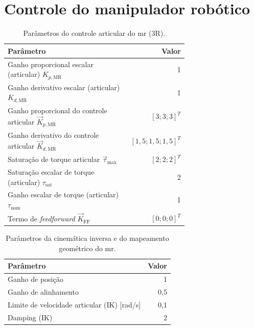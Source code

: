 
\section{Controle do manipulador robótico}
\label{apC_controle_mr}

\begin{table}[H]
\centering
\caption{Parâmetros do controle articular do \gls{mr} (3R).}
\label{ttab_apC_controle_mr}
\begin{tabular}{p{0.70\linewidth}r}
\toprule
\textbf{Parâmetro} & \textbf{Valor} \\
\midrule
Ganho proporcional escalar (articular) $K_{p,\text{MR}}$ & 1 \\
Ganho derivativo escalar (articular) $K_{d,\text{MR}}$   & 1 \\
Ganho proporcional do controle articular $\vec{K}_{p,\text{MR}}$ & $[3;3;3]^T$ \\
Ganho derivativo do controle articular $\vec{K}_{d,\text{MR}}$   & $[1,5;1,5;1,5]^T$ \\
Saturação de torque articular $\vec{\tau}_{\max}$                & $[2;2;2]^T$ \\
Saturação escalar de torque (articular) $\tau_{\text{sat}}$      & 2 \\
Ganho escalar de torque (articular) $\tau_{\text{nom}}$          & 1 \\
Termo de \textit{feedforward} $\vec{K}_{\text{FF}}$              & $[0;0;0]^T$ \\
\bottomrule
\end{tabular}
\end{table}




\begin{table}[H]
\centering
\caption{Parâmetros da cinemática inversa e do mapeamento geométrico do \gls{mr}.}
\label{ttab_apC_ik_mr}
\begin{tabular}{lr}
\toprule
\textbf{Parâmetro} & \textbf{Valor} \\
\midrule
Ganho de posição & 1 \\
Ganho de alinhamento & 0,5 \\
Limite de velocidade articular (IK) [rad/s] & 0,1 \\
Damping (IK) & 2 \\
\bottomrule
\end{tabular}
\end{table}



